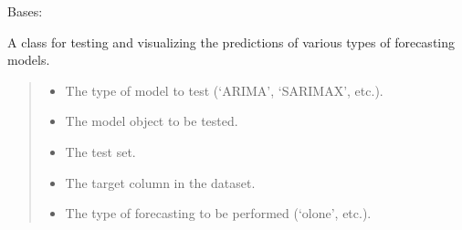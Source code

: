 \documentclass[letterpaper,10pt,english]{sphinxmanual}
\begin{document}
\begin{fulllineitems}
\label{\detokenize{docs/model_testing:model_testing.ModelTest}}
\pysigstartsignatures
{}
\pysigstopsignatures
\sphinxAtStartPar
Bases: 

\sphinxAtStartPar
A class for testing and visualizing the predictions of various types of forecasting models.
\begin{quote}\begin{description}
\begin{itemize}
\item {} 
\sphinxAtStartPar
{} \textendash{} The type of model to test (‘ARIMA’, ‘SARIMAX’, etc.).

\item {} 
\sphinxAtStartPar
{} \textendash{} The model object to be tested.

\item {} 
\sphinxAtStartPar
{} \textendash{} The test set.

\item {} 
\sphinxAtStartPar
{} \textendash{} The target column in the dataset.

\item {} 
\sphinxAtStartPar
{} \textendash{} The type of forecasting to be performed (‘ol\sphinxhyphen{}one’, etc.).

\end{itemize}

\end{description}\end{quote}


\end{fulllineitems}
\end{document}
